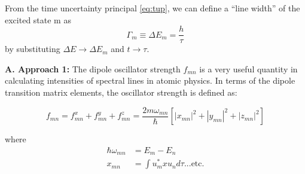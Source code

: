 \documentclass{jhwhw}
\begin{document}
From the time uncertainty principal \eqref{eq:tup}, we can define a ``line width'' of the excited state m as
\begin{equation}
    \Gamma_m \equiv \Delta E_m = \frac{h}{\tau}
\end{equation}
by substituting $\Delta E \rightarrow \Delta E_m$ and $t \rightarrow \tau$. 

\textbf{A. Approach 1:}
The dipole oscillator strength $f_{mn}$ is a very useful quantity in calculating intensities of spectral lines in atomic physics.  In terms of the dipole transition matrix elements, the oscillator strength is defined as:

\begin{equation}
	\label{eq:fmn}
	f_{mn}=f_{mn}^x + f_{mn}^y + f_{mn}^z = \frac{2 m \omega_{mn}}{\hbar}\left[|x_{mn}|^2 + |y_{mn}|^2 + |z_{mn}|^2 \right]
\end{equation}

where 
\begin{align}
	\hbar \omega_{mn} &= E_m - E_n \\
	\label{eq:xmn0}
	x_{mn} &= \int u_m^* x u_n d\tau \text{...etc.}
\end{align}
\end{document}
